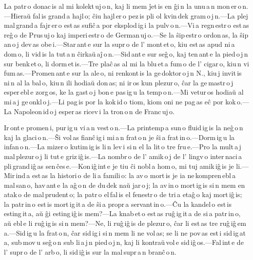 
La patr\,o donac\,is al mi kolekt\,uj\,o\,n, kaj li mem ĵet\,is en ĝi\,n la unu\,a\,n mon\,er\,o\,n.---Hieraŭ fal\,is grand\,a hajl\,o; ĉiu hajl\,er\,o pez\,is pli ol kvin\,dek gram\,o\,j\,n.---La plej mal\,grand\,a fajr\,er\,o est\,as sufiĉ\,a por eksplod\,ig\,i la pulv\,o\,n.---Vi\,a regn\,estr\,o est\,as reĝ\,o de Prus\,uj\,o kaj imperi\,estr\,o de German\,uj\,o.---Se la ŝip\,estr\,o ordon\,as, la ŝip\,an\,o\,j dev\,as obe\,i.---Star\,ant\,e sur la supr\,o de l' mont\,et\,o, kiu est\,as apud ni\,a dom\,o, li vid\,is la tut\,a\,n ĉirkaŭ\,aĵ\,o\,n.---Sid\,ant\,e sur seĝ\,o, kaj ten\,ant\,e la pied\,o\,j\,n sur benk\,et\,o, li dorm\,et\,is.---Tre plaĉ\,as al mi la blu\,et\,a fum\,o de l' cigar\,o, kiu\,n vi fum\,as.---Promen\,ant\,e sur la ale\,o, ni renkont\,is la ge\,doktor\,o\,j\,n N., kiu\,j invit\,is ni\,n al la bal\,o, kiu\,n ili hodiaŭ don\,as; ni ir\,os kun plezur\,o, ĉar la ge\,mastr\,o\,j esper\,ebl\,e zorg\,os, ke la gast\,o\,j bon\,e pas\,ig\,u la temp\,o\,n.---Mi vetur\,os hodiaŭ al mi\,a\,j ge\,onkl\,o\,j.---Li pag\,is por la kok\,id\,o tiom, kiom oni ne pag\,as eĉ por kok\,o.---La Napoleon\,id\,o\,j esper\,as ricev\,i la tron\,o\,n de Franc\,uj\,o. 



Ir\,ont\,e promen\,i, pur\,ig\,u vi\,a\,n vest\,o\,n.---La printemp\,a sun\,o fluid\,ig\,is la neĝ\,o\,n kaj la glaci\,o\,n.---Ŝi vol\,as fianĉ\,ig\,i mi\,a\,n frat\,o\,n je ŝi\,a frat\,in\,o.---Dorm\,ig\,u la infan\,o\,n.---La mizer\,o kutim\,ig\,is li\,n lev\,i si\,n el la lit\,o tre fru\,e.---Pro la mult\,a\,j mal\,plezur\,o\,j li tut\,e griz\,iĝ\,is.---La nombr\,o de l' amik\,o\,j de l' lingv\,o inter\,naci\,a pli\,grand\,iĝ\,as sen\,ĉes\,e.---Kon\,iĝ\,int\,e je tiu ĉi nobl\,a hom\,o, mi tuj amik\,iĝ\,is je li.---Mir\,ind\,a est\,as la histori\,o de li\,a famili\,o: la av\,o mort\,is je ia ne\,kompren\,ebl\,a mal\,san\,o, hav\,ant\,e la aĝ\,o\,n de du\,dek naŭ jar\,o\,j; la av\,in\,o mort\,ig\,is si\,n mem en atak\,o de mal\,prudent\,o; la patr\,o el\,fal\,is el fenestr\,o de tri\,a etaĝ\,o kaj mort\,iĝ\,is; la patr\,in\,o est\,is mort\,ig\,it\,a de ŝi\,a propr\,a servant\,in\,o.---Ĉu la kandel\,o est\,is esting\,it\,a, aŭ ĝi esting\,iĝ\,is mem?---La knab\,et\,o est\,as ruĝ\,ig\,it\,a de si\,a patr\,in\,o, aŭ ebl\,e li ruĝ\,ig\,is si\,n mem?---Ne, li ruĝ\,iĝ\,is de plezur\,o, ĉar li est\,as tre ruĝ\,iĝ\,em\,a.---Sid\,ig\,u la frat\,o\,n, ĉar sid\,ig\,i si\,n mem li ne vol\,as; se li ne pov\,as est\,i sid\,ig\,at\,a, sub\,mov\,u seĝ\,o\,n sub li\,a\,j\,n pied\,o\,j\,n, kaj li kontraŭ\,vol\,e sid\,iĝ\,os.---Fal\,int\,e de l' supr\,o de l' arb\,o, li sid\,iĝ\,is sur la mal\,supr\,a\,n branĉ\,o\,n. 



